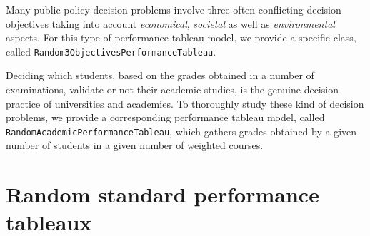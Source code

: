 Many public policy decision problems involve three often conflicting decision objectives taking into account \emph{economical}, \emph{societal} as well as \emph{environmental} aspects. For this type of performance tableau model, we provide a specific class, called \texttt{Random3ObjectivesPerformanceTableau}.

Deciding which students, based on the grades obtained in a number of examinations, validate or not their academic studies, is the genuine decision practice of universities and academies. To thoroughly study these kind of decision problems, we provide a corresponding performance tableau model, called \texttt{RandomAcademic\-PerformanceTableau}, which gathers grades obtained by a given number of students in a given number of weighted courses.    
 
\section{Random standard performance tableaux}
\label{sec:6.2}
    
